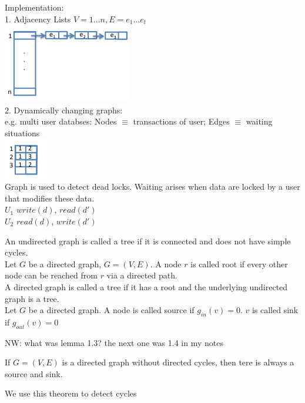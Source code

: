 Implementation: \\
1. Adjacency Lists $V = {1...n}, E = {e_{1}...e_{t}}$ \\
\includegraphics{diagrams/adjacency_list.png} \\
2. Dynamically changing graphs: \\
e.g. multi user databses: Nodes $\equiv$  transactions of user; Edges $\equiv$  waiting situations \\
\includegraphics{diagrams/dynamically_changing_graphs.png} \\
Graph is used to detect dead locks. Waiting arises when data are locked by a user that modifies these data. \\
$U_{1}$ $write(d)$, $read(d')$ \\
$U_{2}$ $read(d)$, $write(d')$

\begin{definition}
    An undirected graph is called a tree if it is connected and does not have simple cycles.\\
    Let $G$ be a directed graph, $G=(V,E)$. A node $r$ is called root if every other node can be 
    reached from $r$ via a directed path. \\
    A directed graph is called a tree if it has a root and the underlying undirected graph is a tree. \\
    Let $G$ be a directed graph. A node is called source if $g_{in}(v) = 0$. $v$ is called sink if $g_{out}(v) = 0$
\end{definition}

\begin{lemma}
    NW: what was lemma 1.3? the next one was 1.4 in my notes
\end{lemma}
\begin{lemma}
    If $G=(V,E)$ is a directed graph without directed cycles, then tere is always a source and sink.
\end{lemma}
We use this theorem to detect cycles

